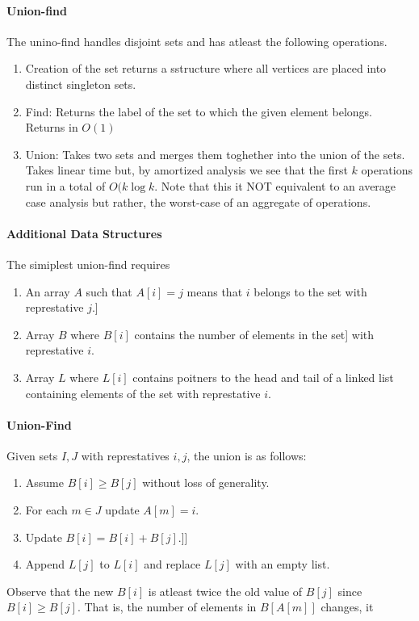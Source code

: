 \paragraph{Union-find}
The unino-find handles disjoint sets and has atleast the following operations.
\begin{enumerate}
    \item Creation of the set returns a sstructure where all vertices are placed into distinct singleton sets.
    \item Find: Returns the label of the set to which the given element belongs. Returns in \(O(1)\)
    \item Union: Takes two sets and merges them toghether into the union of the sets.
        Takes linear time but, by amortized analysis we see that the first \(k\) operations run in a total of \(O(k\log k\).
        Note that this it NOT equivalent to an average case analysis but rather, the worst-case of an aggregate of operations.
\end{enumerate}

\paragraph{Additional Data Structures}
The simiplest union-find requires
\begin{enumerate}
    \item An array \(A\) such that \(A[i] = j\) means that \(i\) belongs
        to the set with represtative \(j\).]
    \item Array \(B\) where \(B[i]\) contains the number of elements in the set]
        with represtative \(i\).
    \item Array \(L\) where \(L[i]\) contains poitners to the head and tail of a linked list
        containing elements of the set with represtative \(i\).
\end{enumerate}

\paragraph{Union-Find}
Given sets \(I, J\) with represtatives \(i, j\), the union is as follows:
\begin{enumerate}
    \item Assume \(B[i] \geq B[j]\) without loss of generality.
    \item For each \(m \in J\) update \(A[m] = i\).
    \item Update \(B[i] = B[i] + B[j]\).]]
    \item Append \(L[j]\) to \(L[i]\) and replace \(L[j]\) with an empty list.
\end{enumerate}

Observe that the new \(B[i]\) is atleast twice the old value of \(B[j]\) since
\(B[i] \geq B[j]\). That is, the number of elements in \(B[A[m]]\) changes, it



